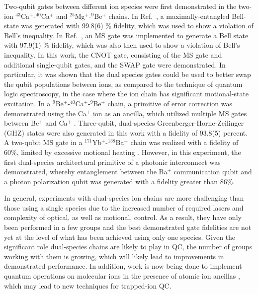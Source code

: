 \documentclass[%
reprint,
 amsmath,amssymb,
]{revtex4-1}
\begin{document}
Two-qubit gates between different ion species were first demonstrated in the two-ion $^{43}$Ca$^+$-$^{40}$Ca$^+$ \cite{BallanceHybridLogic2015} and $^{25}$Mg$^+$-$^9$Be$^+$ \cite{TanMultiElement2015} chains.  In Ref.~\cite{BallanceHybridLogic2015}, a maximally-entangled Bell-state was generated with 99.8(6) \% fidelity, which was used to show a violation of Bell's inequality.  In Ref.~\cite{TanMultiElement2015}, an MS gate was implemented to generate a Bell state with 97.9(1) \% fidelity, which was also then used to show a violation of Bell's inequality.  In this work, the CNOT gate, consisting of the MS gate and additional single-qubit gates, and the SWAP gate were demonstrated.  In particular, it was shown that the dual species gates could be used to better swap the qubit populations between ions, as compared to the technique of quantum logic spectroscopy, in the case where the ion chain has significant motional-state excitation.  In a $^{9}$Be$^+$-$^{40}$Ca$^+$-$^{9}$Be$^+$ chain, a primitive of error correction was demonstrated using the Ca$^+$ ion as an ancilla, which utilized multiple MS gates between Be$^+$ and Ca$^+$ \cite{NegnevitskyMultiReadout2018}.  Three-qubit, dual-species Greenberger-Horne-Zeilinger (GHZ) states were also generated in this work with a fidelity of 93.8(5) percent.  A two-qubit MS gate in a  $^{171}$Yb$^+$-$^{138}$Ba$^+$ chain was realized with a fidelity of 60\%, limited by excessive motional heating \cite{InlekMultiNode2017}.  However, in this experiment, the first dual-species architectural primitive of a photonic interconnect was demonstrated, whereby entanglement between the Ba$^+$ communication qubit and a photon polarization qubit was generated with a fidelity greater than 86\%.

In general, experiments with dual-species ion chains are more challenging than those using a single species due to the increased number of required lasers and complexity of optical, as well as motional, control.  As a result, they have only been performed in a few groups and the best demonstrated gate fidelities are not yet at the level of what has been achieved using only one species.  Given the significant role dual-species chains are likely to play in QC, the number of groups working with them is growing, which will likely lead to improvements in demonstrated performance.  In addition, work is now being done to implement quantum operations on molecular ions in the presence of atomic ion ancillas \cite{ChouMolecularIon2017, HudsonMolecularQC2018}, which may lead to new techniques for trapped-ion QC.
\end{document}
